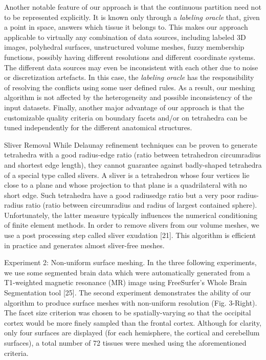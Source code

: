 {Another notable feature of our approach is that the continuous partition need not to be represented explicitly. It is known only through a {\it labeling oracle} that, given a point in space, answers which tissue it belongs to. This makes our approach applicable to virtually any combination of data sources, including labeled 3D images, polyhedral surfaces, unstructured volume meshes, fuzzy membership functions, possibly having different resolutions and different coordinate systems. The different data sources may even be inconsistent with each other due to noise or discretization artefacts. In this case, the {\it labeling oracle} has the responsibility of resolving the conflicts using some user defined rules. As a result, our meshing algorithm is not affected by the heterogeneity and possible inconsistency of the input datasets. Finally, another major advantage of our approach is that the customizable quality criteria on boundary facets and/or on tetrahedra can be tuned independently for the different anatomical structures.

Sliver Removal
While Delaunay refinement techniques can be proven to generate tetrahedra with a good radius-edge ratio (ratio between tetrahedron circumradius and shortest edge length), they cannot guarantee against badly-shaped tetrahedra of a special type called slivers. A sliver is a tetrahedron whose four vertices lie close to a plane and whose projection to that plane is a quadrilateral with no short edge. Such tetrahedra have a good radiusedge ratio but a very poor radius-radius ratio (ratio between circumradius and radius of largest contained sphere). Unfortunately, the latter measure typically influences the numerical conditioning of finite element methods. In order to remove slivers from our volume meshes, we use a post processing step called sliver exudation [21]. This algorithm is efficient in practice and generates almost sliver-free meshes.

Experiment 2: Non-uniform surface meshing. In the three following experiments, we use some segmented brain data which were automatically generated from a T1-weighted magnetic resonance (MR) image using FreeSurfer's Whole Brain Segmentation tool [25]. The second experiment demonstrates the ability of our algorithm to produce surface meshes with non-uniform resolution (Fig. 3-Right). The facet size criterion was chosen to be spatially-varying so that the occipital cortex would be more finely sampled than the frontal cortex. Although for clarity, only four surfaces are displayed (for each hemisphere, the cortical and cerebellum surfaces), a total number of 72 tissues were meshed using the aforementioned criteria.

}



